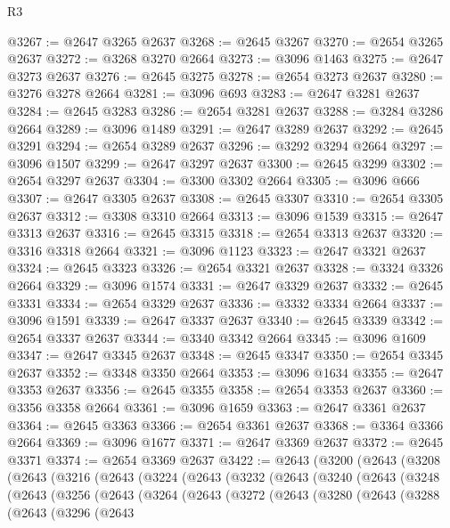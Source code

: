 \begin{lexlean}{R3}
\begin{coremodule}
@3267 := @2647 @3265 @2637
@3268 := @2645 @3267
@3270 := @2654 @3265 @2637
@3272 := @3268 @3270 @2664
@3273 := @3096 @1463
@3275 := @2647 @3273 @2637
@3276 := @2645 @3275
@3278 := @2654 @3273 @2637
@3280 := @3276 @3278 @2664
@3281 := @3096 @693
@3283 := @2647 @3281 @2637
@3284 := @2645 @3283
@3286 := @2654 @3281 @2637
@3288 := @3284 @3286 @2664
@3289 := @3096 @1489
@3291 := @2647 @3289 @2637
@3292 := @2645 @3291
@3294 := @2654 @3289 @2637
@3296 := @3292 @3294 @2664
@3297 := @3096 @1507
@3299 := @2647 @3297 @2637
@3300 := @2645 @3299
@3302 := @2654 @3297 @2637
@3304 := @3300 @3302 @2664
@3305 := @3096 @666
@3307 := @2647 @3305 @2637
@3308 := @2645 @3307
@3310 := @2654 @3305 @2637
@3312 := @3308 @3310 @2664
@3313 := @3096 @1539
@3315 := @2647 @3313 @2637
@3316 := @2645 @3315
@3318 := @2654 @3313 @2637
@3320 := @3316 @3318 @2664
@3321 := @3096 @1123
@3323 := @2647 @3321 @2637
@3324 := @2645 @3323
@3326 := @2654 @3321 @2637
@3328 := @3324 @3326 @2664
@3329 := @3096 @1574
@3331 := @2647 @3329 @2637
@3332 := @2645 @3331
@3334 := @2654 @3329 @2637
@3336 := @3332 @3334 @2664
@3337 := @3096 @1591
@3339 := @2647 @3337 @2637
@3340 := @2645 @3339
@3342 := @2654 @3337 @2637
@3344 := @3340 @3342 @2664
@3345 := @3096 @1609
@3347 := @2647 @3345 @2637
@3348 := @2645 @3347
@3350 := @2654 @3345 @2637
@3352 := @3348 @3350 @2664
@3353 := @3096 @1634
@3355 := @2647 @3353 @2637
@3356 := @2645 @3355
@3358 := @2654 @3353 @2637
@3360 := @3356 @3358 @2664
@3361 := @3096 @1659
@3363 := @2647 @3361 @2637
@3364 := @2645 @3363
@3366 := @2654 @3361 @2637
@3368 := @3364 @3366 @2664
@3369 := @3096 @1677
@3371 := @2647 @3369 @2637
@3372 := @2645 @3371
@3374 := @2654 @3369 @2637
@3422 := @2643
    (@3200
      (@2643
        (@3208
          (@2643
            (@3216
              (@2643
                (@3224
                  (@2643
                    (@3232
                      (@2643
                        (@3240
                          (@2643
                            (@3248
                              (@2643
                                (@3256
                                  (@2643
                                    (@3264
                                      (@2643
                                        (@3272
                                          (@2643
                                            (@3280
                                              (@2643
                                                (@3288
                                                  (@2643
                                                    (@3296
                                                      (@2643

\end{coremodule}
\end{lexlean}
